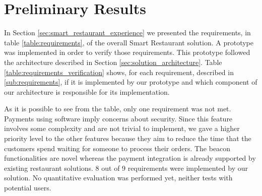 
\section{Preliminary Results}
\label{sec:preliminary_results}
In Section \ref{sec:smart_restaurant_experience} we presented the
requirements, in table \ref{table:requirements}, of the overall
Smart Restaurant solution.
A prototype was implemented in order to verify those requirements.
This prototype followed the architecture described in Section
\ref{sec:solution_architecture}.
Table \ref{table:requirements_verification} shows, for each requirement,
described in \ref{sub:requirements}, if it is implemented by our prototype
and which component of our architecture is responsible for its implementation.



As it is possible to see from the table, only one requirement was not met.
Payments using software imply concerns about security. Since this feature
involves some complexity and are not trivial to implement, we gave
a higher priority level to the other features
because they aim to reduce the time
that the customers spend waiting for someone to process their orders.
The beacon functionalities are novel whereas the payment integration is
already supported by existing restaurant solutions.
8 out of 9 requirements were implemented by our solution.
No quantitative evaluation was performed yet, neither tests with
potential users.
